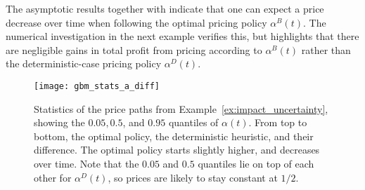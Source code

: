 \documentclass[main.tex]{subfiles}
\begin{document}
The asymptotic results together with  indicate that one can expect a price
decrease over time when following the optimal pricing policy
$\alpha^B(t)$.
The numerical investigation in the next example verifies this, but highlights
that there are negligible gains in total profit from pricing according to
$\alpha^B(t)$ rather than the deterministic-case
pricing policy $\alpha^D(t)$.

\begin{figure}[htb]
  \centering
  \texttt{[image: gbm\_stats\_a\_diff]}
  \caption{Statistics of the price paths from
    Example~\ref{ex:impact_uncertainty}, %
    showing the $0.05,0.5$, and
    $0.95$ quantiles of $\alpha(t)$. From top to bottom, the optimal
    policy, the deterministic heuristic, and their difference.
    The optimal policy starts slightly higher, and decreases over
    time.
    Note that the $0.05$ and $0.5$ quantiles lie on top of each
    other for $\alpha^D(t)$, so prices are likely to stay constant
    at $1/2$.
  }\label{fig:gbm_stats_a}
\end{figure}
\end{document}
